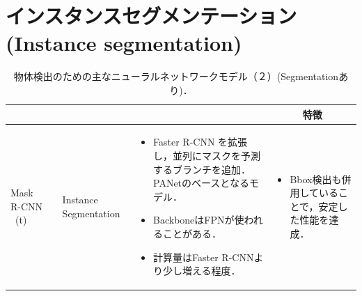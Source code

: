 \documentclass[originalpaper,fleqn]{jsaiart}     %
\begin{document}
\section{インスタンスセグメンテーション(Instance segmentation)}
\begin{table}
    \caption{物体検出のための主なニューラルネットワークモデル（２）(Segmentationあり)．}
    \label{tbl-cheat2}
    \begin{center}
        \setlength{\tabcolsep}{3pt}
        \footnotesize
        \begin{tabularx}{\linewidth}{Xp{1.5cm}Xp{7cm}X} \toprule
            \centering{モデル名称} & \centering{文献} & \centering{用途} & \centering{概要} & \multicolumn{1}{c}{特徴} \\ \midrule

            Mask R-CNN \ (t)\footnote[1] & \cite{HGDG17} & Instance Segmentation & 
            \begin{itemize}
                \vspace{-0.7\baselineskip}
                \setlength{\leftskip}{-3mm}
                \item Faster R-CNN を拡張し，並列にマスクを予測するブランチを追加．PANetのベースとなるモデル．
                \item BackboneはFPNが使われることがある．
                \item 計算量はFaster R-CNNより少し増える程度．
            \end{itemize}
            &
            \begin{itemize}
                \vspace{-0.7\baselineskip}
                \setlength{\leftskip}{-3mm}
                \item Bbox検出も併用していることで，安定した性能を達成．
            \end{itemize}
            \\


\end{tabularx}
\end{center}
\end{table}
\end{document}
